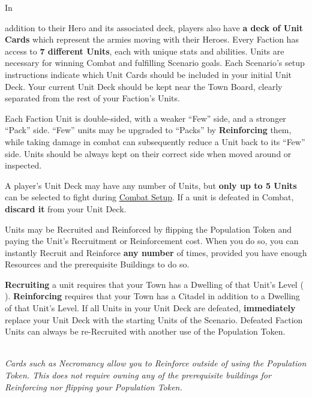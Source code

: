 
\begin{multicols*}{2}


\hypertarget{Units}{In} addition to their Hero and its associated deck, players also have \textbf{a deck of Unit Cards} which represent the armies moving with their Heroes.
Every Faction has access to \textbf{7 different Units}, each with unique stats and abilities.
Units are necessary for winning Combat and fulfilling Scenario goals.
Each Scenario's setup instructions indicate which Unit Cards should be included in your initial Unit Deck.
Your current Unit Deck should be kept near the Town Board, clearly separated from the rest of your Faction's Units.\par
Each Faction Unit is double-sided, with a weaker “Few” side, and a stronger “Pack” side.
“Few” units may be upgraded to “Packs” by \textbf{Reinforcing} them, while taking damage in combat can subsequently reduce a Unit back to its “Few” side.
Units should be always kept on their correct side when moved around or inspected.\par
A player's Unit Deck may have any number of Units, but \textbf{only up to 5 Units} can be selected to fight during \hyperlink{Combatsetup}{Combat Setup}.
If a unit is defeated in Combat, \textbf{discard it} from your Unit Deck.\par
Units may be Recruited and Reinforced by flipping the Population Token and paying the Unit's Recruitment  or Reinforcement  cost.
When you do so, you can instantly Recruit and Reinforce \textbf{any number} of times, provided you have enough Resources and the prerequisite Buildings to do so.\par

\textbf{Recruiting} a unit requires that your Town has a Dwelling of that Unit's Level ( ).
\textbf{Reinforcing} requires that your Town has a Citadel in addition to a Dwelling of that Unit's Level.
If all Units in your Unit Deck are defeated, \textbf{immediately} replace your Unit Deck with the starting Units of the Scenario. Defeated Faction Units can always be re-Recruited with another use of the Population Token.\par

\par
\bigskip

\begin{center}
  \\
  \footnotesize\textit{
    Cards such as Necromancy allow you to Reinforce outside of using the Population Token.
    This does not require owning any of the prerequisite buildings for Reinforcing nor flipping your Population Token.
  }
\end{center}

\clearpage

\end{multicols*}
